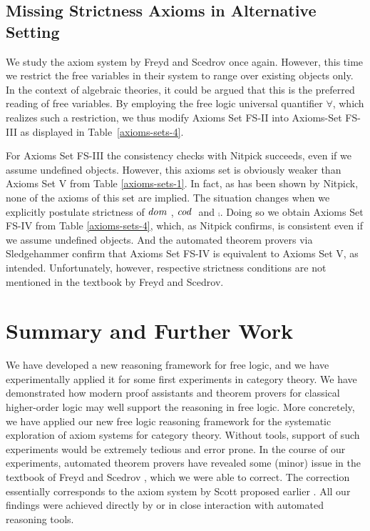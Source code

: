 \subsection{Missing Strictness Axioms in Alternative
  Setting} \label{subsec-freyd-scedrov-2} We study the axiom system by
Freyd and Scedrov once again. However, this time we restrict the free
variables in their system to range over existing objects only. In the
context of algebraic theories, it could be argued that this is the
preferred reading of free variables.  By employing the free logic
universal quantifier $\forall$, which realizes such a restriction, 
we thus modify Axioms Set FS-II into
Axioms-Set FS-III as displayed in Table~\ref{axioms-sets-4}.  

For Axioms Set FS-III the consistency checks with Nitpick succeeds,
even if we assume undefined objects. However, this axioms set is
obviously weaker than Axioms Set V from Table
\ref{axioms-sets-1}. In fact, as has been shown by Nitpick, none of
the axioms of this set are implied.  The situation changes when we
explicitly postulate strictness of $\textit{dom \/}$, $\textit{cod \/}$ and $\comp$. Doing
so we obtain Axioms Set FS-IV from Table \ref{axioms-sets-4}, which,
as Nitpick confirms, is consistent even if we assume undefined
objects. And the automated theorem provers via Sledgehammer confirm
that Axioms Set FS-IV is equivalent to Axioms Set V, as
intended. Unfortunately, however, respective strictness conditions are
not mentioned in the textbook by Freyd and Scedrov.





\section{Summary and Further Work}
We have developed a new reasoning framework for free logic, and we
have experimentally applied it for some first experiments in category
theory.  We have demonstrated how modern proof assistants and theorem
provers for classical higher-order logic may well support the
reasoning in free logic. More concretely, we have applied our new free
logic reasoning framework for the systematic exploration of axiom
systems for category theory. Without tools, support of such experiments
would be extremely tedious and error prone.
In the course of our experiments, automated theorem provers 
have revealed some (minor) issue in the textbook of Freyd and Scedrov \cite{FreydScedrov90},
which we were able to correct. The correction essentially corresponds
to the axiom system by Scott proposed earlier \cite{Scott67}.
All our findings were achieved directly by or in
close interaction with automated reasoning tools. 

